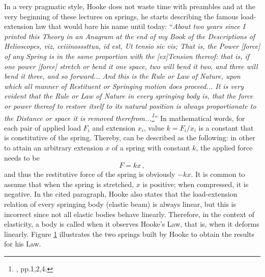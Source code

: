In a very pragmatic style, Hooke does not waste time with preambles and at the very beginning of these lectures on springs, he starts describing the famous load-extension law that would bare his name until today: ``\emph{About two years since I printed this Theory in an Anagram at the end of my Book of the Descriptions of Helioscopes, \emph{viz, ceiiinosssttuu, id est, Ut tensio sic vis}; That is, the Power [force] of any Spring is in the same proportion with the [ex]Tension thereof: that is, if one power [force] stretch or bend it one space, two will bend it two, and three will bend it three, and so forward... And this is the Rule or Law of Nature, upon which all manner of Restituent or Springing motion does proceed... It is very evident that the Rule or Law of Nature in every springing body is, that the force or power thereof to restore itself to its natural position is always proportionate to the Distance or space it is removed therefrom...\footnote{\cite{hooke_1678_1}, pp.1,2,4.}}'' In mathematical words, for each pair of applied load $F_i$ and extension $x_i$, value $k=F_i/x_i$ is a constant that is constitutive of the spring. Thereby,  can be described as the following: in other to attain an arbitrary extension $x$ of a spring with constant $k$, the applied force needs to be 
\begin{equation}
F=kx\,,
\end{equation}
and thus the restitutive force of the spring is obviously $-kx$. It is common to assume that when the spring is stretched, $x$ is positive; when compressed, it is negative. In the cited paragraph, Hooke also states that the load-extension relation of every springing body (elastic beam) is always linear, but this is incorrect since not all elastic bodies behave linearly. Therefore, in the context of elasticity, a body is called  when it observes Hooke's Law, that is, when it deforms linearly. Figure \ref{fg:hooke} illustrates the two springs built by Hooke to obtain the results for his Law.  
\begin{figure}[!ht]
	\centering
	\begin{center}
	\end{center}
	\label{fg:hooke}
\end{figure}

